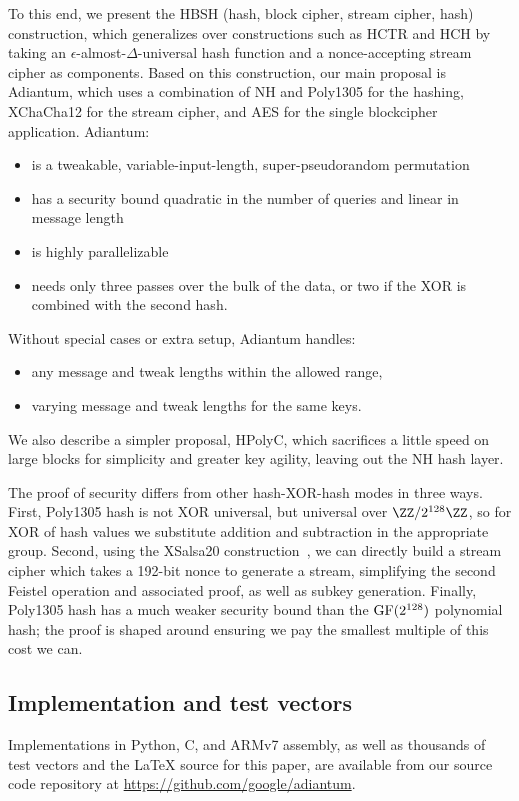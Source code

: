 \documentclass[eprint.tex]{subfiles}
\begin{document}
To this end, we present the HBSH (hash, block cipher, stream cipher, hash)
construction, which generalizes over constructions such as
HCTR and HCH by taking an $\epsilon$-almost-$\Delta$-universal hash function and a
nonce-accepting stream cipher
as components. Based on this construction, our main proposal is Adiantum,
which uses a combination of NH and Poly1305 for the hashing, XChaCha12 for the stream cipher, and
AES for the single blockcipher application. Adiantum:
\begin{itemize}
    \item is a tweakable, variable-input-length, super-pseudorandom permutation
    \item has a security bound quadratic in the number of queries and linear in message length
    \item is highly parallelizable
    \item needs only three passes over the bulk of the data, or
        two if the XOR is combined with the second hash.
\end{itemize}

Without special cases or extra setup, Adiantum handles:
\begin{itemize}
    \item any message and tweak lengths within the allowed range,
    \item varying message and tweak lengths for the same keys.
\end{itemize}

We also describe a simpler proposal, HPolyC, which sacrifices a little speed on large blocks
for simplicity and greater key agility, leaving out the NH hash layer.

The proof of security differs from other hash-XOR-hash modes in three ways. First,
Poly1305 hash is not XOR universal, but universal over $\ZZ/2^{128}\ZZ$,
so for XOR of hash values we substitute addition and subtraction in the appropriate group.
Second, using the XSalsa20 construction~\cite{xsalsa}, we can directly
build a stream cipher which takes a 192-bit nonce to generate a stream, simplifying
the second Feistel operation and associated proof, as well as subkey generation.
Finally, Poly1305 hash has a much weaker security bound than the $\operatorname{GF}(2^{128})$ polynomial hash;
the proof is shaped around ensuring we pay the smallest multiple of this cost we can.

\subsection{Implementation and test vectors}
Implementations in Python, C, and ARMv7 assembly, as well as thousands of test
vectors and the \LaTeX{} source for this paper,  are available from our source code
repository at \url{https://github.com/google/adiantum}.

\subbib
\end{document}
